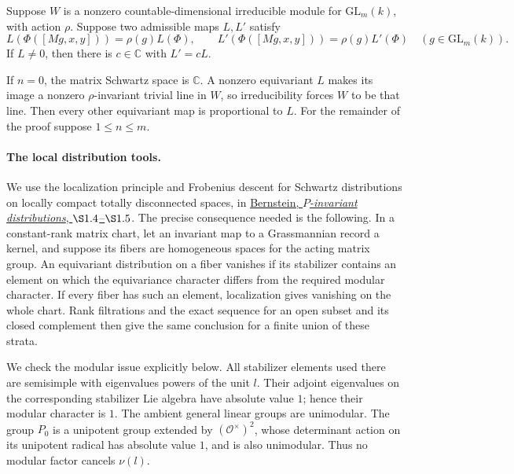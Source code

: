 Suppose \(W\) is a nonzero countable-dimensional irreducible
module for \(\mathrm{GL}_m(k)\), with action \(\rho\).
Suppose two admissible maps \(L,L'\) satisfy
\begin{equation}
 L(\Phi([Mg,x,y]))=\rho(g)L(\Phi),\qquad
 L'(\Phi([Mg,x,y]))=\rho(g)L'(\Phi)
                      \quad(g\in\mathrm{GL}_m(k)).
 \label{eq:sr-br-middle}
\end{equation}
If \(L\ne0\), then there is \(c\in\mathbb C\) with \(L'=cL\).

If \(n=0\), the matrix Schwartz space is \(\mathbb C\).
A nonzero equivariant \(L\) makes its image a nonzero
\(\rho\)-invariant trivial line in \(W\), so irreducibility
forces \(W\) to be that line.  Then every other equivariant
map is proportional to \(L\).
For the remainder of the proof suppose \(1\le n\le m\).

\paragraph{The local distribution tools.}
We use the localization principle and Frobenius descent for
Schwartz distributions on locally compact totally disconnected
spaces, in
\href{https://www.math.tau.ac.il/~bernstei/Publication_list/publication_texts/Bernstein-P-invar-SLN.pdf}
{Bernstein, \emph{\(P\)-invariant distributions}, \(\S1.4\)--\(\S1.5\)}.
The precise consequence needed is the following.
In a constant-rank matrix chart, let an invariant map to a
Grassmannian record a kernel, and suppose its fibers are
homogeneous spaces for the acting matrix group.
An equivariant distribution on a fiber vanishes if its
stabilizer contains an element on which the equivariance
character differs from the required modular character.
If every fiber has such an element, localization gives
vanishing on the whole chart.  Rank filtrations and the exact
sequence for an open subset and its closed complement then
give the same conclusion for a finite union of these strata.

We check the modular issue explicitly below.  All stabilizer
elements used there are semisimple with eigenvalues powers of
the unit \(l\).  Their adjoint eigenvalues on the corresponding
stabilizer Lie algebra have absolute value \(1\); hence their
modular character is \(1\).  The ambient general linear
groups are unimodular.  The group \(P_0\) is a unipotent group
extended by \((\mathcal O^\times)^2\), whose determinant action
on its unipotent radical has absolute value \(1\), and is
also unimodular.  Thus no modular factor cancels \(\nu(l)\).

